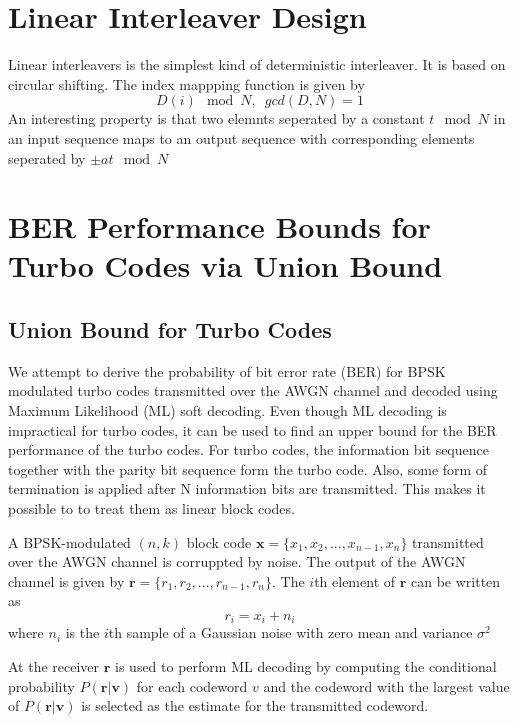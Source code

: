\documentclass[20 pts]{article}
\begin{document}
\section{Linear Interleaver Design}
Linear interleavers is the simplest kind of deterministic interleaver. It is based on
circular shifting. The index mappping function is given by 
\begin{equation}
D(i) \mod N,\,\,\, gcd(D,N)=1
\end{equation}
 An interesting property is that two elemnts seperated by a constant $t \mod N$ in
 an input sequence maps to an output sequence with corresponding elements
 seperated by $\pm at \mod N$
\section{ BER Performance Bounds for Turbo Codes via Union Bound}

\subsection{Union Bound for Turbo Codes}
We attempt to derive the probability of bit error rate (BER) for BPSK modulated turbo
codes transmitted over the AWGN channel and decoded using Maximum Likelihood 
(ML) soft decoding. Even though ML decoding is impractical for turbo codes, it can be used
 to find an upper bound for the BER performance of the turbo codes. 
For turbo codes, the information bit sequence together with the parity bit sequence
form the turbo code. Also, some form of termination is applied after N information
bits are transmitted. This makes it possible to to treat them as linear block 
codes. 

A BPSK-modulated $(n,k)$ block code  
$\mathbf{x}=\{x_1, x_2,...,x_{n-1}, x_n \}$
transmitted over the AWGN channel is corruppted by
 noise. The output of the AWGN channel is given by $\mathbf{r}=
 \{r_1, r_2,...,r_{n-1}, r_n \}$. The $i$th element of $\mathbf{r}$ can be written as
\begin{equation}
r_i=x_i+n_i
\label{rx sig}
\end{equation}
where $n_i$ is the $i$th sample of a Gaussian noise with zero mean and variance
$\sigma^2$
    
    At the receiver $\mathbf{r}$ is used to perform ML decoding by computing the 
    conditional probability $P(\mathbf{r}|\mathbf{v})$ for each codeword $v$ and the
    codeword with the largest value of $P(\mathbf{r}|\mathbf{v})$ is selected as the
    estimate for the transmitted codeword.
    
\end{document}

